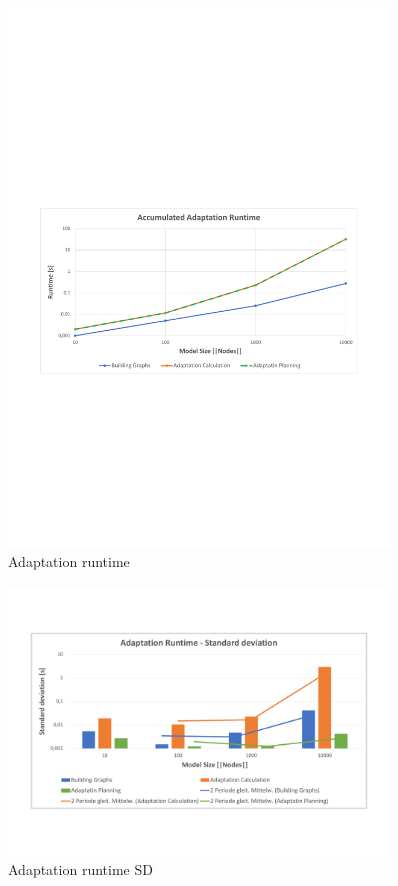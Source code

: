 \begin{figure}[h]
	\centering
	\includegraphics[trim = 15mm 95mm 15mm 105mm, clip, width=0.90\textwidth]{graphs/Runtime_adapt}
	\caption{Adaptation runtime}
	\label{fig:eval:adap:runtime}
\end{figure}

\begin{figure}[h]
	\centering
	\includegraphics[trim = 10mm 30mm 10mm 20mm, clip, width=0.90\textwidth]{graphs/Runtime_adapt_sd}
	\caption{Adaptation runtime SD}
	\label{fig:eval:adap:runtime_sd}
\end{figure}

